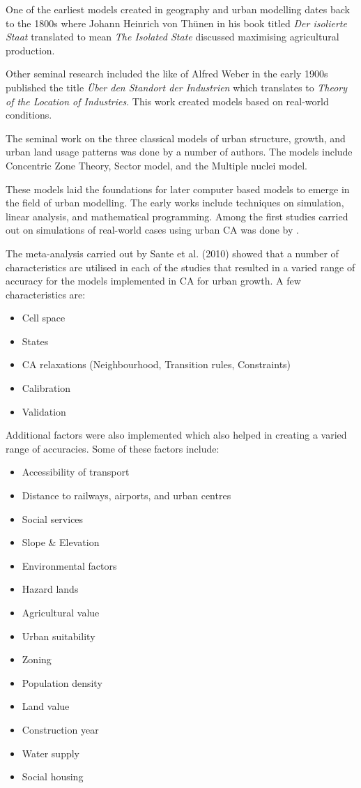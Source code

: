 One of the earliest models created in geography and urban modelling dates back to the 1800s where Johann Heinrich von Th{\"u}nen in his book titled \textsl{Der isolierte Staat} translated to mean \textsl{The Isolated State} discussed maximising agricultural production\citep{clark1967thunen}.

Other seminal research included the like of Alfred Weber in the early 1900s published the title \textsl{{\"U}ber den Standort der Industrien} which translates to \textsl{Theory of the Location of Industries}. This work created models based on real-world conditions\citep{fearon2006alfred}.

The seminal work on the three classical models of urban structure, growth, and urban land usage patterns was done by a number of authors. The models include Concentric Zone Theory, Sector model, and the Multiple nuclei model\citep{liu2008modelling}.

These models laid the foundations for later computer based models to emerge in the field of urban modelling. The early works include techniques on simulation, linear analysis, and mathematical programming\citep{kilbridge1970population}.
Among the first studies carried out on simulations of real-world cases using urban CA was done by \citep{batty}.

The meta-analysis carried out by Sante et al. (2010) showed that a number of characteristics are utilised in each of the studies that resulted in a varied range of accuracy for the models implemented in CA for urban growth\citep{ca1}.
A few characteristics are:
\begin{itemize}
\item Cell space
\item States
\item CA relaxations (Neighbourhood, Transition rules, Constraints)
\item Calibration
\item Validation
\end{itemize}
Additional factors were also implemented which also helped in creating a
varied range of accuracies. Some of these factors include:
\begin{multicols}{2}
\begin{itemize}
\item Accessibility of transport
\item Distance to railways, airports, and urban centres
\item Social services
\item Slope \& Elevation
\item Environmental factors
\item Hazard lands
\item Agricultural value
\item Urban suitability
\item Zoning
\item Population density
\item Land value
\item Construction year
\item Water supply
\item Social housing
\end{itemize}
\end{multicols}
